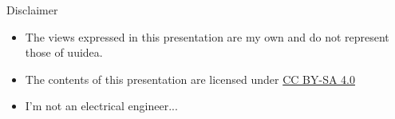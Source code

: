 
\begin{frame}{Disclaimer}
	\begin{itemize}

		\item The views expressed in this presentation are my own and do not represent those of uuidea.
		\item The contents of this presentation are licensed under \href{https://creativecommons.org/licenses/by-sa/4.0/deed.en}{CC BY-SA 4.0}\pause
		\item I'm not an electrical engineer...
	\end{itemize}
\end{frame}
